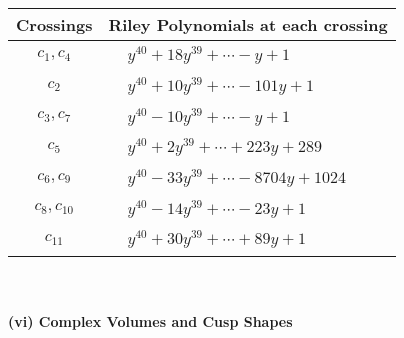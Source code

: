 \documentclass[1p]{elsarticle_modified}
\theoremstyle{definition}
\begin{document}
\begin{tabular}{m{50pt}|m{274pt}}
Crossings & \hspace{64pt}Riley Polynomials at each crossing \\
\hline $$\begin{aligned}c_{1},c_{4}\end{aligned}$$&$\begin{aligned}
&y^{40}+18 y^{39}+\cdots- y+1
\end{aligned}$\\
\hline $$\begin{aligned}c_{2}\end{aligned}$$&$\begin{aligned}
&y^{40}+10 y^{39}+\cdots-101 y+1
\end{aligned}$\\
\hline $$\begin{aligned}c_{3},c_{7}\end{aligned}$$&$\begin{aligned}
&y^{40}-10 y^{39}+\cdots- y+1
\end{aligned}$\\
\hline $$\begin{aligned}c_{5}\end{aligned}$$&$\begin{aligned}
&y^{40}+2 y^{39}+\cdots+223 y+289
\end{aligned}$\\
\hline $$\begin{aligned}c_{6},c_{9}\end{aligned}$$&$\begin{aligned}
&y^{40}-33 y^{39}+\cdots-8704 y+1024
\end{aligned}$\\
\hline $$\begin{aligned}c_{8},c_{10}\end{aligned}$$&$\begin{aligned}
&y^{40}-14 y^{39}+\cdots-23 y+1
\end{aligned}$\\
\hline $$\begin{aligned}c_{11}\end{aligned}$$&$\begin{aligned}
&y^{40}+30 y^{39}+\cdots+89 y+1
\end{aligned}$\\
\hline
\end{tabular}\\~\\
\newpage\flushleft \textbf{(vi) Complex Volumes and Cusp Shapes}
\end{document}
